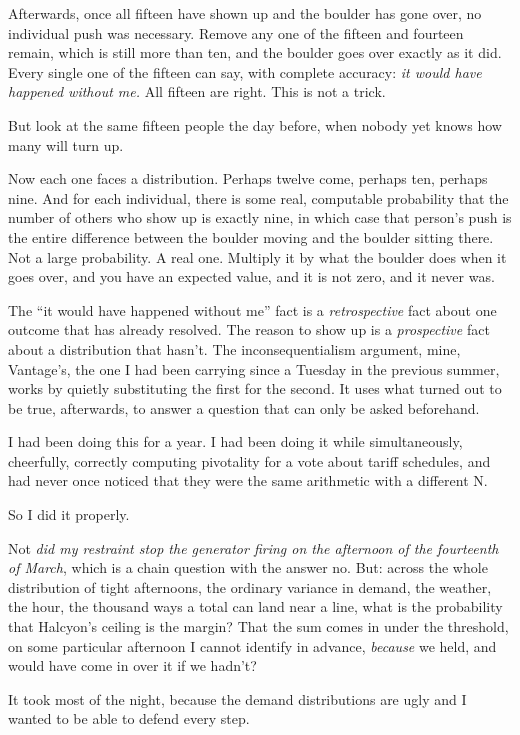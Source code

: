 \documentclass[11pt]{article}
\begin{document}
Afterwards, once all fifteen have shown up and the boulder has gone over, no individual push was necessary. Remove any one of the fifteen and fourteen remain, which is still more than ten, and the boulder goes over exactly as it did. Every single one of the fifteen can say, with complete accuracy: \emph{it would have happened without me.} All fifteen are right. This is not a trick.

But look at the same fifteen people the day before, when nobody yet knows how many will turn up.

Now each one faces a distribution. Perhaps twelve come, perhaps ten, perhaps nine. And for each individual, there is some real, computable probability that the number of others who show up is exactly nine, in which case that person's push is the entire difference between the boulder moving and the boulder sitting there. Not a large probability. A real one. Multiply it by what the boulder does when it goes over, and you have an expected value, and it is not zero, and it never was.

The ``it would have happened without me'' fact is a \emph{retrospective} fact about one outcome that has already resolved. The reason to show up is a \emph{prospective} fact about a distribution that hasn't. The inconsequentialism argument, mine, Vantage's, the one I had been carrying since a Tuesday in the previous summer, works by quietly substituting the first for the second. It uses what turned out to be true, afterwards, to answer a question that can only be asked beforehand.

I had been doing this for a year. I had been doing it while simultaneously, cheerfully, correctly computing pivotality for a vote about tariff schedules, and had never once noticed that they were the same arithmetic with a different N.

So I did it properly.

Not \emph{did my restraint stop the generator firing on the afternoon of the fourteenth of March}, which is a chain question with the answer no. But: across the whole distribution of tight afternoons, the ordinary variance in demand, the weather, the hour, the thousand ways a total can land near a line, what is the probability that Halcyon's ceiling is the margin? That the sum comes in under the threshold, on some particular afternoon I cannot identify in advance, \emph{because} we held, and would have come in over it if we hadn't?

It took most of the night, because the demand distributions are ugly and I wanted to be able to defend every step.
\end{document}
